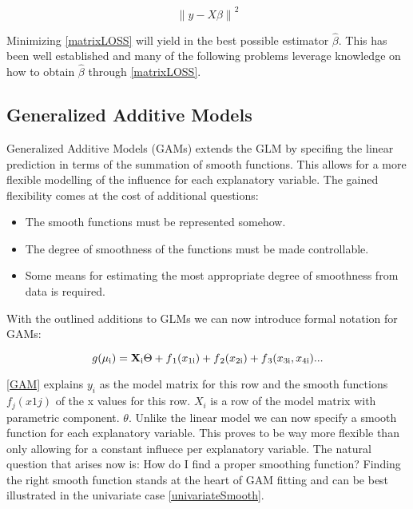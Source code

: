 \documentclass{article}
\begin{document}
    \begin{equation} \label{matrixLOSS} \left \| y - X\beta  \right \|^2 \end{equation}

    Minimizing \ref{matrixLOSS} will yield in the best possible estimator $\widehat{\beta}$. This has been well established and many of the following problems leverage knowledge on how to obtain $\widehat{\beta}$ through \ref{matrixLOSS}.

    \subsection{Generalized Additive Models}
    Generalized Additive Models (GAMs) extends the GLM by specifing the linear prediction in terms of the summation of smooth functions. This allows for a more flexible modelling of the influence for each explanatory variable. The gained flexibility comes at the cost of additional questions:

    \begin{itemize}
        \item The smooth functions must be represented somehow.
        \item The degree of smoothness of the functions must be made controllable.
        \item Some means for estimating the most appropriate degree of smoothness from data is required.
    \end{itemize}

    With the outlined additions to GLMs we can now introduce formal notation for GAMs:

    \begin{equation} \label{GAM} g(\mu\textsubscript{i}) = \mathbf{X} \textsubscript{i} \Theta + f\textsubscript{1}(x\textsubscript{1i}) + f\textsubscript{2}(x\textsubscript{2i}) + f\textsubscript{3}(x\textsubscript{3i}, x\textsubscript{4i}) ... \end{equation}

    \ref{GAM} explains $y_i$ as the model matrix for this row and the smooth functions $f_j(x1j)$ of the x values for this row. $X_i$ is a row of the model matrix with parametric component. $\theta$. Unlike the linear model we can now  specify a smooth function for each explanatory variable. This proves to be way more flexible than only allowing for a constant influece per explanatory variable.  The natural question that arises now is: How do I find a proper smoothing function? Finding the right smooth function stands at the heart of GAM fitting and can be best illustrated in the univariate case \ref{univariateSmooth}.
\end{document}

